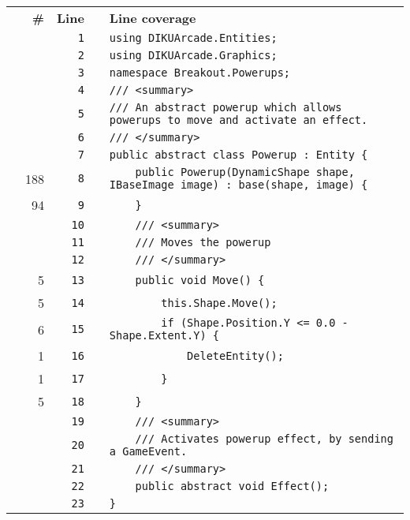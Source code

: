 \documentclass[a4paper,landscape,10pt]{article}
\begin{document}
\begin{longtable}[l]{lrrll}
\textbf{} & \textbf{\#} & \textbf{Line} & \textbf{} & \textbf{Line coverage}\\
\cellcolor{gray} &  & \verb~1~ & & \verb~using DIKUArcade.Entities;~\\
\cellcolor{gray} &  & \verb~2~ & & \verb~using DIKUArcade.Graphics;~\\
\cellcolor{gray} &  & \verb~3~ & & \verb~namespace Breakout.Powerups;~\\
\cellcolor{gray} &  & \verb~4~ & & \verb~/// <summary>~\\
\cellcolor{gray} &  & \verb~5~ & & \verb~/// An abstract powerup which allows powerups to move and activate an effect.~\\
\cellcolor{gray} &  & \verb~6~ & & \verb~/// </summary>~\\
\cellcolor{gray} &  & \verb~7~ & & \verb~public abstract class Powerup : Entity {~\\
\cellcolor{green} & 188 & \verb~8~ & & \verb~    public Powerup(DynamicShape shape, IBaseImage image) : base(shape, image) {~\\
\cellcolor{green} & 94 & \verb~9~ & & \verb~    }~\\
\cellcolor{gray} &  & \verb~10~ & & \verb~    /// <summary>~\\
\cellcolor{gray} &  & \verb~11~ & & \verb~    /// Moves the powerup~\\
\cellcolor{gray} &  & \verb~12~ & & \verb~    /// </summary>~\\
\cellcolor{green} & 5 & \verb~13~ & & \verb~    public void Move() {~\\
\cellcolor{green} & 5 & \verb~14~ & & \verb~        this.Shape.Move();~\\
\cellcolor{green} & 6 & \verb~15~ & & \verb~        if (Shape.Position.Y <= 0.0 - Shape.Extent.Y) {~\\
\cellcolor{green} & 1 & \verb~16~ & & \verb~            DeleteEntity();~\\
\cellcolor{green} & 1 & \verb~17~ & & \verb~        }~\\
\cellcolor{green} & 5 & \verb~18~ & & \verb~    }~\\
\cellcolor{gray} &  & \verb~19~ & & \verb~    /// <summary>~\\
\cellcolor{gray} &  & \verb~20~ & & \verb~    /// Activates powerup effect, by sending a GameEvent.~\\
\cellcolor{gray} &  & \verb~21~ & & \verb~    /// </summary>~\\
\cellcolor{gray} &  & \verb~22~ & & \verb~    public abstract void Effect();~\\
\cellcolor{gray} &  & \verb~23~ & & \verb~}~\\
\end{longtable}
\newpage
\end{document}
